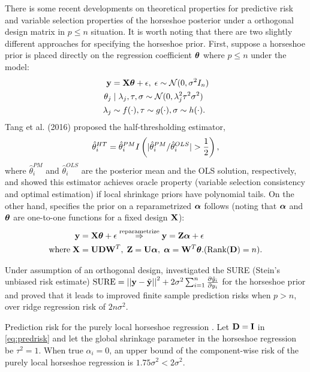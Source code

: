 \documentclass[sts,preprint]{imsart}
\begin{document}
There is some recent developments on theoretical properties for predictive risk and variable selection properties of the horseshoe posterior under a orthogonal design matrix in $p \le n$ situation. It is worth noting that there are two slightly different approaches for specifying the horseshoe prior. First, suppose a horseshoe prior is placed directly on the regression coefficient
$\boldsymbol{\theta}$ where $p \le n$ under the model:
\begin{align*}
{\bf y} & = {\bf X} \boldsymbol{\theta} + \epsilon, \; \epsilon \sim {\cal N}(0, \sigma^2 I_n) \\
\theta_j & \mid \lambda_j, \tau, \sigma \sim {\cal N}(0, \lambda_j^2 \tau^2 \sigma^2) \\
\lambda_j & \sim f(\cdot), \tau \sim g(\cdot), \sigma \sim h(\cdot). 
\end{align*}
Tang et al. (2016) proposed the half-thresholding estimator,
\[
\hat{\theta}_i^{HT} = \hat{\theta}_i^{PM} I \left(\lvert \hat{\theta}_i^{PM}/\hat{\theta}_i^{OLS}\rvert > \frac{1}{2} \right),
\]
where $\hat{\theta}_i^{PM}$ and $\hat{\theta}_i^{OLS}$ are the posterior mean and the OLS solution, respectively, and showed this estimator achieves oracle property (variable selection consistency and optimal estimation) if local shrinkage priors have polynomial tails. On the other hand, \citet{bhadra2016prediction} specifies the prior on a reparametrized $\boldsymbol{\alpha}$ follows (noting that $\boldsymbol{\alpha}$ and $\boldsymbol{\theta}$ are one-to-one functions for a fixed design ${\bf X}$):
\begin{align}
{\bf y} & = {\bf X} \boldsymbol{\theta} + \epsilon \stackrel{\text{reparametrize}}{\Rightarrow} {\bf y} = {\bf Z} \boldsymbol{\alpha} + \epsilon \nonumber \\
\text{where} \; {\bf X} & = {\bf U} {\bf D} {\bf W}^T, \; {\bf Z} = {\bf U} \boldsymbol{\alpha}, \; \boldsymbol{\alpha} = {\bf W}^T \boldsymbol{\theta}. (\text{Rank}({\bf D}) = n). \label{eq:predrisk}
\end{align}

Under assumption of an orthogonal design, \citet{bhadra2016prediction} investigated the SURE (Stein's unbiased risk estimate) $\text{SURE} = \left|\left|{\bf y} - \tilde{{\bf y}}\right|\right|^2 + 2 \sigma^2 \sum_{i=1}^{n} \frac{\partial \tilde{y}_i}{\partial y_i}$ for the horseshoe prior and proved that it leads to improved finite sample prediction risks when $p > n$, over ridge regression risk of $2n \sigma^2$. 

\begin{theorem}
Prediction risk for the purely local horseshoe regression \citep{bhadra2016prediction}. Let ${\bf D} = {\bf I}$ in \eqref{eq:predrisk} and let the global shrinkage parameter in the horseshoe regression be $\tau^2 = 1$. When true $\alpha_i = 0$, an upper bound of the component-wise risk of the purely local horseshoe regression is $1.75\sigma^2 < 2\sigma^2$. 
\end{theorem}
\end{document}
